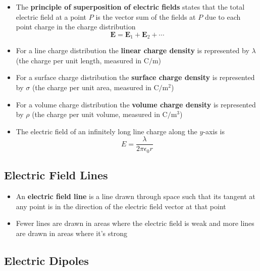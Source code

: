 \documentclass{article}
\begin{document}
\begin{itemize}
  \item The \textbf{principle of superposition of electric fields} states that the total electric field at a point $P$ is the vector sum of the fields at $P$ due to each point charge in the charge distribution \[\mathbf{E} = \mathbf{E}_1 + \mathbf{E}_2 + \cdots\]

  \item For a line charge distribution the \textbf{linear charge density} is represented by $\lambda$ (the charge per unit length, measured in $\textrm{C}/\textrm{m}$)

  \item For a surface charge distribution the \textbf{surface charge density} is represented by $\sigma$ (the charge per unit area, measured in $\textrm{C}/\textrm{m}^2$)

  \item For a volume charge distribution the \textbf{volume charge density} is represented by $\rho$ (the charge per unit volume, measured in $\textrm{C}/\textrm{m}^3$)

  \item The electric field of an infinitely long line charge along the $y$-axis is \[E = \frac{\lambda}{2\pi\epsilon_0 r}\]
\end{itemize}

\subsection{Electric Field Lines}

\begin{itemize}
  \item An \textbf{electric field line} is a line drawn through space such that its tangent at any point is in the direction of the electric field vector at  that point

  \item Fewer lines are drawn in areas where the electric field is weak and more lines are drawn in areas where it's strong
\end{itemize}

\subsection{Electric Dipoles}
\end{document}
